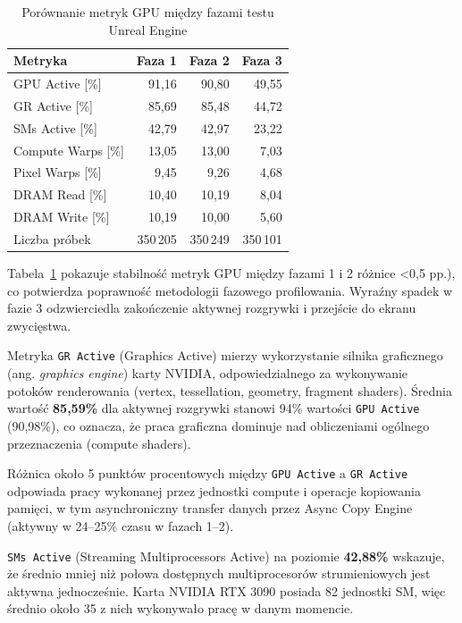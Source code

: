 \begin{table}[H]
\centering
\caption{Porównanie metryk GPU między fazami testu Unreal Engine}
\label{tab:unreal-gpu-phases}
\begin{tabular}{|l|r|r|r|}
\hline
\textbf{Metryka} & \textbf{Faza 1} & \textbf{Faza 2} & \textbf{Faza 3} \\
\hline
GPU Active [\%] & 91,16 & 90,80 & 49,55 \\
GR Active [\%] & 85,69 & 85,48 & 44,72 \\
SMs Active [\%] & 42,79 & 42,97 & 23,22 \\
Compute Warps [\%] & 13,05 & 13,00 & 7,03 \\
Pixel Warps [\%] & 9,45 & 9,26 & 4,68 \\
DRAM Read [\%] & 10,40 & 10,19 & 8,04 \\
DRAM Write [\%] & 10,19 & 10,00 & 5,60 \\
Liczba próbek & 350\,205 & 350\,249 & 350\,101 \\
\hline
\end{tabular}
\end{table}

Tabela~\ref{tab:unreal-gpu-phases} pokazuje stabilność metryk GPU między fazami 1 i 2 
różnice <0,5 pp.), 
co potwierdza poprawność metodologii 
fazowego profilowania.
Wyraźny spadek w fazie 
3 odzwierciedla zakończenie aktywnej rozgrywki i przejście do ekranu zwycięstwa.


Metryka \texttt{GR Active} (Graphics Active) mierzy wykorzystanie silnika graficznego (ang. \textit{graphics engine}) karty NVIDIA, odpowiedzialnego 
za wykonywanie potoków renderowania (vertex, tessellation, geometry, fragment shaders). Średnia wartość \textbf{85,59\%} dla aktywnej rozgrywki 
stanowi 94\% wartości \texttt{GPU Active} (90,98\%), co oznacza, że praca graficzna dominuje nad obliczeniami ogólnego przeznaczenia (compute shaders).

Różnica około 5 punktów procentowych między \texttt{GPU Active} a \texttt{GR Active} odpowiada pracy wykonanej przez jednostki compute i operacje 
kopiowania pamięci, w tym asynchroniczny transfer danych przez Async Copy Engine (aktywny w 24--25\% czasu w fazach 1--2).


\texttt{SMs Active} (Streaming Multiprocessors Active) na poziomie \textbf{42,88\%} wskazuje, że średnio mniej niż połowa dostępnych multiprocesorów 
strumieniowych jest aktywna jednocześnie. Karta NVIDIA RTX 3090 posiada 82 jednostki SM, więc średnio około 35 z nich wykonywało pracę w danym momencie.

